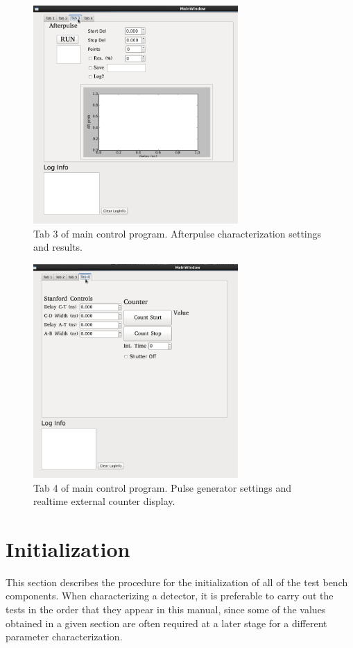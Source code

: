 \documentclass{article}
\begin{document}
\begin{figure}
\centering
\includegraphics[width=7.8cm]{images/tab3.png}
\caption{Tab 3 of main control program. Afterpulse characterization settings and results.}
\label{tab3}
\end{figure}

\begin{figure}
\centering
\includegraphics[width=7.8cm]{images/tab4.png}
\caption{Tab 4 of main control program. Pulse generator settings and realtime external counter display.}
\label{tab4}
\end{figure}


\section{Initialization}
This section describes the procedure for the initialization of all of the test bench components. When characterizing a detector, it is preferable to carry out the tests in the order that they appear in this manual, since some of the values obtained in a given section are often required at a later stage for a different parameter characterization.
\end{document}

